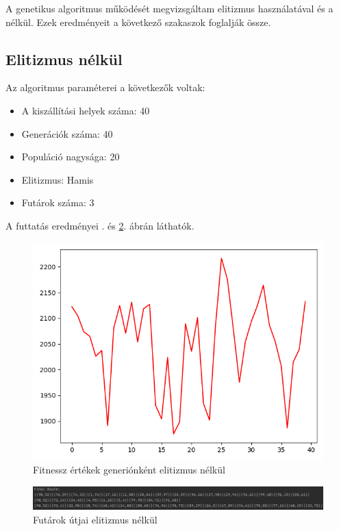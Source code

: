 
A genetikus algoritmus működését megvizsgáltam elitizmus használatával és a nélkül.
Ezek eredményeit a következő szakaszok foglalják össze.

\subsection{Elitizmus nélkül}

Az algoritmus paraméterei a következők voltak:
\begin{itemize}
\item A kiszállítási helyek száma: 40
\item Generációk száma: 40
\item Populáció nagysága: 20
\item Elitizmus: Hamis
\item  Futárok száma: 3
\end{itemize}

A futtatás eredményei . és \ref{fig:MTSPMultiDepo1Route}. ábrán láthatók.

\begin{figure}[!htb]
\centering
\includegraphics[scale=0.7]{images/MTSPMultiDepo1.png}
\caption{Fitnessz értékek generiónként elitizmus nélkül}
\label{fig:MTSPMultiDepo1}
\end{figure}

\begin{figure}[!htb]
\centering
\includegraphics[width=\textwidth]{images/MTSPMultiDepo1Route.png}
\caption{Futárok útjai elitizmus nélkül}
\label{fig:MTSPMultiDepo1Route}
\end{figure}

